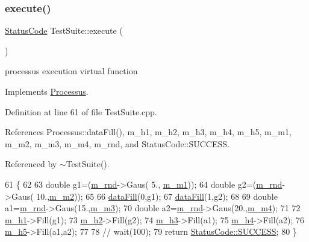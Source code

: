 \subsubsection{\texorpdfstring{execute()}{execute()}}
{\footnotesize\ttfamily \hyperlink{classStatusCode}{Status\+Code} Test\+Suite\+::execute (\begin{DoxyParamCaption}{ }\end{DoxyParamCaption})\hspace{0.3cm}{\ttfamily [virtual]}}

processus execution virtual function 

Implements \hyperlink{classProcessus_a63767a63a1fb0055c5aa45b21a4a5d58}{Processus}.



Definition at line 61 of file Test\+Suite.\+cpp.



References Processus\+::data\+Fill(), m\+\_\+h1, m\+\_\+h2, m\+\_\+h3, m\+\_\+h4, m\+\_\+h5, m\+\_\+m1, m\+\_\+m2, m\+\_\+m3, m\+\_\+m4, m\+\_\+rnd, and Status\+Code\+::\+S\+U\+C\+C\+E\+SS.



Referenced by $\sim$\+Test\+Suite().


\begin{DoxyCode}
61                                 \{
62 
63   \textcolor{keywordtype}{double} g1=(\hyperlink{classTestSuite_a8288c9104c87bfc3934e2b6bffdef66f}{m\_rnd}->Gaus( 5., \hyperlink{classTestSuite_a853a92fd3e82371d19993739c2bf1236}{m\_m1}));
64   \textcolor{keywordtype}{double} g2=(\hyperlink{classTestSuite_a8288c9104c87bfc3934e2b6bffdef66f}{m\_rnd}->Gaus( 10.,\hyperlink{classTestSuite_a710aa6029d3d0b47b61a828a472f7546}{m\_m2}));
65 
66   \hyperlink{classProcessus_a0d093b48f3218a088ba030e24372f18c}{dataFill}(0,g1);
67   \hyperlink{classProcessus_a0d093b48f3218a088ba030e24372f18c}{dataFill}(1,g2);
68 
69   \textcolor{keywordtype}{double} a1=\hyperlink{classTestSuite_a8288c9104c87bfc3934e2b6bffdef66f}{m\_rnd}->Gaus(15.,\hyperlink{classTestSuite_acbc062956d67a5f47dfb74286a390300}{m\_m3});
70   \textcolor{keywordtype}{double} a2=\hyperlink{classTestSuite_a8288c9104c87bfc3934e2b6bffdef66f}{m\_rnd}->Gaus(20.,\hyperlink{classTestSuite_ac3d39b72dd5fce4c48eb39ea56be3e36}{m\_m4});
71 
72   \hyperlink{classTestSuite_a8691ed6da0262d0e09d512b58375f94c}{m\_h1}->Fill(g1);
73   \hyperlink{classTestSuite_ad08c4828466d73e1273408ecd3547baf}{m\_h2}->Fill(g2);
74   \hyperlink{classTestSuite_a86ca996cbb37caad3bcc32a138737e27}{m\_h3}->Fill(a1);
75   \hyperlink{classTestSuite_a86739625b47a8ce6ebe2d7fb9f5128e3}{m\_h4}->Fill(a2);
76   \hyperlink{classTestSuite_a384f4680f040072ec87b872bb4778ed6}{m\_h5}->Fill(a1,a2);
77 
78   \textcolor{comment}{//  wait(100);}
79   \textcolor{keywordflow}{return} \hyperlink{classStatusCode_a6f565cbeadc76d14c72f047e5e85eb4badd0da38d3ba0d922efd1f4619bc37ad8}{StatusCode::SUCCESS};
80 \}
\end{DoxyCode}
\mbox{\label{classTestSuite_a3a1658a78902d96e00c888c17862abdb}} 
